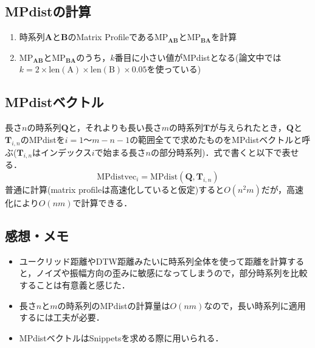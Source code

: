 \documentclass{jsarticle}
\begin{document}
\subsection{MPdistの計算}
\begin{enumerate}
	\item 時系列$\boldsymbol{A}$と$\boldsymbol{B}$のMatrix Profileである$\mathrm{MP}_{\boldsymbol{AB}}$と$\mathrm{MP}_{\boldsymbol{BA}}$を計算\\
	\item $\mathrm{MP}_{\boldsymbol{AB}}$と$\mathrm{MP}_{\boldsymbol{BA}}$のうち，$k$番目に小さい値がMPdistとなる(論文中では$k = 2 \times \mathrm{len(A)} \times \mathrm{len(B)} \times 0.05$を使っている)
\end{enumerate}


\subsection{MPdistベクトル}
長さ$n$の時系列$\boldsymbol{Q}$と，それよりも長い長さ$m$の時系列$\boldsymbol{T}$が与えられたとき，$\boldsymbol{Q}$と$\boldsymbol{T}_{i,n}$のMPdistを$i=1～m-n-1$の範囲全てで求めたものをMPdistベクトルと呼ぶ($\boldsymbol{T}_{i,n}$はインデックス$i$で始まる長さ$n$の部分時系列)．式で書くと以下で表せる．
\begin{displaymath}
\mathrm{MPdistvec}_i = \mathrm{MPdist}(\boldsymbol{Q},\boldsymbol{T}_{i,n})
\end{displaymath}
普通に計算(matrix profileは高速化していると仮定)すると$O(n^2m)$だが，高速化により$O(nm)$で計算できる．

\subsection{感想・メモ}
\begin{itemize}
	\item ユークリッド距離やDTW距離みたいに時系列全体を使って距離を計算すると，ノイズや振幅方向の歪みに敏感になってしまうので，部分時系列を比較することは有意義と感じた．
	\item 長さ$n$と$m$の時系列のMPdistの計算量は$O(nm)$なので，長い時系列に適用するには工夫が必要．
	\item MPdistベクトルはSnippetsを求める際に用いられる．
\end{itemize}
\end{document}
